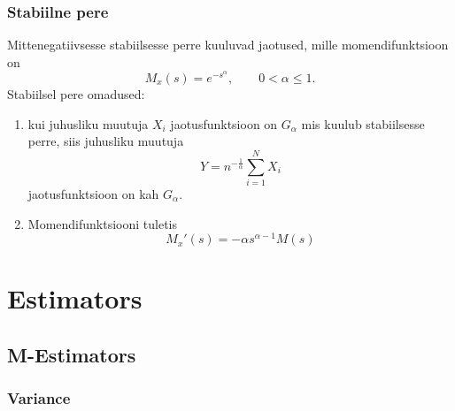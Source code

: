 \documentclass[a4paper]{article}
\numberwithin{equation}{subsection}
\begin{document}
\subsubsection{Stabiilne pere}
Mittenegatiivsesse stabiilsesse perre kuuluvad jaotused, mille
momendifunktsioon on
\begin{equation}
M_x (s) = e^{-s^\alpha}, \qquad 0 < \alpha \le 1.
\end{equation}
Stabiilsel pere omadused:
\begin{enumerate}
\item kui juhusliku muutuja $X_i$ jaotusfunktsioon on $G_\alpha$ mis kuulub
  stabiilsesse perre, siis juhusliku muutuja
  \begin{equation}
    Y = n^{-\frac{1}{\alpha}} \sum_{i=1}^N X_i
  \end{equation}
  jaotusfunktsioon on kah $G_\alpha$.
\item Momendifunktsiooni tuletis
  \begin{equation}
    M_x'(s) = -\alpha s^{\alpha - 1} M(s)
  \end{equation}
\end{enumerate}




\newpage
{}
\section{Estimators}
\label{sec:estimators}

\subsection{M-Estimators}
\label{sec:M-Estimators}

\subsubsection{Variance}
\label{sec:M-Estimators_variance}
\end{document}
